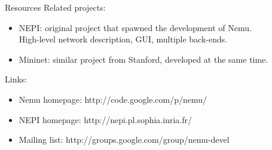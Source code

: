 \documentclass{beamer}
\begin{document}
\begin{frame}{Resources}
  Related projects:\\
  \begin{itemize}
  \item NEPI: original project that spawned the development of Nemu.\\
  High-level network description, GUI, multiple back-ends.
  \item Mininet: similar project from Stanford, developed at the same time.
  \end{itemize}
  \hfill

  Links:\\
  \begin{itemize}
  \item Nemu homepage: http://code.google.com/p/nemu/
  \item NEPI homepage: http://nepi.pl.sophia.inria.fr/
  \item Mailing list: http://groups.google.com/group/nemu-devel
  \end{itemize}
\end{frame}
\end{document}
